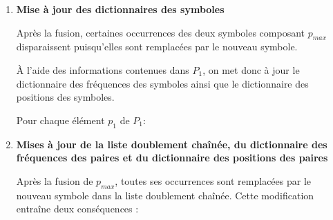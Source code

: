 \documentclass[12pt,a4paper]{report}
\begin{document}
\begin{enumerate}
\begin{enumerate}[label=\alph*)]
			L'ensemble $P_4$ contient ainsi toutes les paires dont le score devra être recalculé après la mise à jour des fréquences des symboles et des fréquences des paires.
			
			L'utilisation d'un ensemble garantit qu'une même paire n'est enregistrée qu'une seule fois, même si elle est rencontrée plusieurs fois lors de la construction de $P_4$. Ainsi, le score de chaque paire n'est recalculé qu'une seule fois.
			
			\item \textbf{Mise à jour des dictionnaires des symboles}
			
			Après la fusion, certaines occurrences des deux symboles composant $p_{max}$ disparaissent puisqu'elles sont remplacées par le nouveau symbole.
			
			À l'aide des informations contenues dans $P_1$, on met donc à jour le dictionnaire des fréquences des symboles ainsi que le dictionnaire des positions des symboles.
			
			Pour chaque élément $p_1$ de $P_1$:
			
			
		\item \textbf{Mises à jour de la liste doublement chaînée, du dictionnaire des fréquences des paires et du dictionnaire des positions des paires}
			
			Après la fusion de $p_{max}$, toutes ses occurrences sont remplacées par le nouveau symbole dans la liste doublement chaînée. Cette modification entraîne deux conséquences :
			
\end{enumerate}
\end{enumerate}
\end{document}
